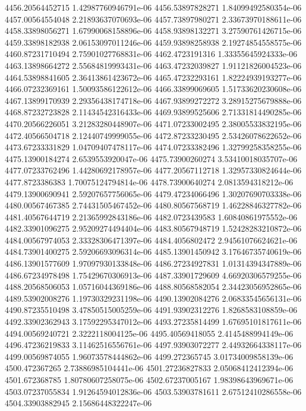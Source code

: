 {4456.20564452715 1.42987760946791e-06
4456.53897828271 1.84099492580354e-06
4457.00564554048 2.21893637070693e-06
4457.73897980271 2.33673970188611e-06
4458.33898056271 1.67990068158896e-06
4458.93898132271 3.27590761426715e-06
4459.33898182938 2.06153097011246e-06
4459.93898258938 2.19274854558575e-06
4460.87231710494 2.75901027768831e-06
4462.4723191316 1.33355645924333e-06
4463.13898664272 2.55684819993431e-06
4463.47232039827 1.91121826004523e-06
4464.53898841605 2.36413861423672e-06
4465.47232293161 1.82224939193277e-06
4466.07232369161 1.50093586122612e-06
4466.33899069605 1.51733620230608e-06
4467.13899170939 2.29356438174718e-06
4467.93899272272 3.28915275679888e-06
4468.87232723828 2.11434542316433e-06
4469.93899525606 2.71331814490285e-06
4470.20566226051 3.21283280448907e-06
4471.07233002495 2.38005533832195e-06
4472.40566504718 2.12440749999055e-06
4472.87233230495 2.53426078622652e-06
4473.67233331829 1.04709407478117e-06
4474.07233382496 1.32799258358255e-06
4475.13900184274 2.6539553920047e-06
4475.73900260274 3.53410018035707e-06
4477.07233762496 1.44280692178957e-06
4477.20567112718 1.32957330824644e-06
4477.8723386383 1.70075124794814e-06
4478.73900640274 2.0813594318212e-06
4479.13900690941 2.59207657756065e-06
4479.47234066496 1.30207690703338e-06
4480.00567467385 2.74431505467452e-06
4480.80567568719 1.46228846327782e-06
4481.40567644719 2.21365992843186e-06
4482.0723439583 1.60840861975552e-06
4482.33901096275 2.95209274494404e-06
4483.80567948719 1.52428283210872e-06
4484.00567974053 2.33328306471397e-06
4484.4056802472 2.94561076624621e-06
4484.73901400275 2.59206693096314e-06
4485.13901450942 3.17646735740619e-06
4486.13901577609 1.97097930133848e-06
4486.27234927831 1.01314394347889e-06
4486.67234978498 1.75429670306913e-06
4487.33901729609 4.66920306579255e-06
4488.20568506053 1.05716044369186e-06
4488.80568582054 2.34423056952865e-06
4489.53902008276 1.19730329231198e-06
4490.13902084276 2.06833545656131e-06
4490.87235510498 3.47850515005259e-06
4491.93902312276 1.8268583108859e-06
4492.33902362943 3.17592295347012e-06
4493.27235814499 1.67695101817611e-06
4494.00569240721 2.3222118004125e-06
4495.40569418055 2.4145488994149e-06
4496.47236219833 3.11462516556761e-06
4497.93903072277 2.44932664338117e-06
4499.00569874055 1.96073578444862e-06
4499.272365745 3.01734009858139e-06
4500.472367265 2.73886985104441e-06
4501.27236827833 2.05068412412394e-06
4501.672368785 1.80780607258075e-06
4502.67237005167 1.98398643969671e-06
4503.07237055834 1.91264594012836e-06
4503.53903781611 2.67512410286558e-06
4504.33903882945 2.15686448322247e-06
}
